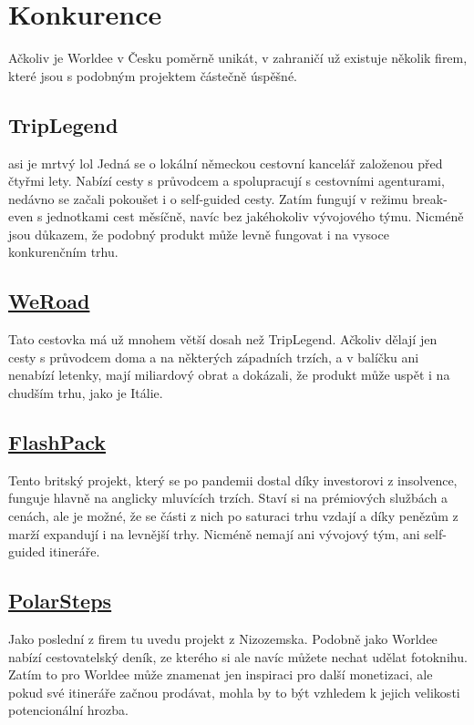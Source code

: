 \section{Konkurence}

Ačkoliv je Worldee v Česku poměrně unikát, v zahraničí už existuje několik firem, které jsou s podobným projektem částečně úspěšné.

\subsection*{TripLegend} 
asi je mrtvý lol
Jedná se o lokální německou cestovní kancelář založenou před čtyřmi lety. Nabízí cesty s průvodcem a spolupracují s cestovními agenturami, nedávno se začali pokoušet i o self-guided cesty. Zatím fungují v režimu break-even s jednotkami cest měsíčně, navíc bez jakéhokoliv vývojového týmu. Nicméně jsou důkazem, že podobný produkt může levně fungovat i na vysoce konkurenčním trhu.

\subsection*{\href{https://www.weroad.com/}{WeRoad}}
Tato cestovka má už mnohem větší dosah než TripLegend. Ačkoliv dělají jen cesty s průvodcem doma a na některých západních trzích, a v balíčku ani nenabízí letenky, mají miliardový obrat a dokázali, že produkt může uspět i na chudším trhu, jako je Itálie.

\subsection*{\href{https://www.flashpack.com/}{FlashPack}}
Tento britský projekt, který se po pandemii dostal díky investorovi z insolvence, funguje hlavně na anglicky mluvících trzích. Staví si na prémiových službách a cenách, ale je možné, že se části z nich po saturaci trhu vzdají a díky penězům z marží expandují i na levnější trhy. Nicméně nemají ani vývojový tým, ani self-guided itineráře.

\subsection*{\href{https://www.polarsteps.com/}{PolarSteps}}
Jako poslední z firem tu uvedu projekt z Nizozemska. Podobně jako Worldee nabízí cestovatelský deník, ze kterého si ale navíc můžete nechat udělat fotoknihu. Zatím to pro Worldee může znamenat jen inspiraci pro další monetizaci, ale pokud své itineráře začnou prodávat, mohla by to být vzhledem k jejich velikosti potencionální hrozba.